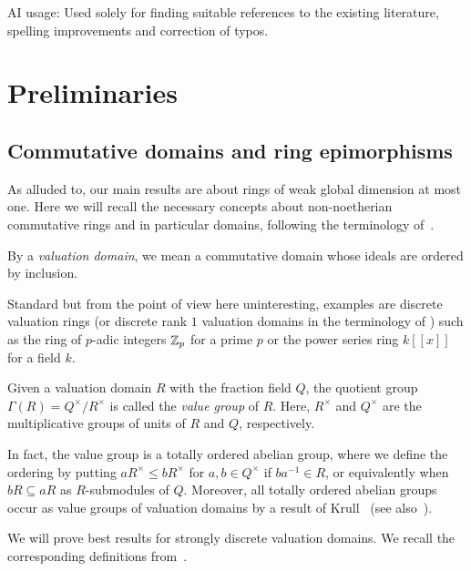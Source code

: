 \documentclass[reqno,a4paper]{amsart}
\begin{document}
AI usage: Used solely for finding suitable references to the existing literature, spelling improvements and correction of typos.


\section{Preliminaries}

\subsection{Commutative domains and ring epimorphisms}

As alluded to, our main results are about rings of weak global dimension at most one. Here we will recall the necessary concepts about non-noetherian commutative rings and in particular domains, following the terminology of~\cite{fs01}.

\begin{definition}[{\cite[\S II.1]{fs01}}] \label{def:VD}
By a \emph{valuation domain}, we mean a commutative domain whose ideals are ordered by inclusion.
\end{definition}

Standard but from the point of view here uninteresting, examples are discrete valuation rings (or discrete rank $1$ valuation domains in the terminology of \cite{fs01}) such as the ring of $p$-adic integers $\mathbb{Z}_p$ for a prime $p$ or the power series ring $k[[x]]$ for a field $k$.

\begin{definition}[{\cite[\S II.3]{fs01}}] \label{def:value-group}
Given a valuation domain $R$ with the fraction field $Q$, the quotient group $\Gamma(R) = Q^\times/R^\times$ is called the \emph{value group} of $R$. Here, $R^\times$ and $Q^\times$ are the multiplicative groups of units of $R$ and $Q$, respectively.
\end{definition}

In fact, the value group is a totally ordered abelian group, where we define the ordering by putting $aR^\times\le bR^\times$ for $a,b\in Q^\times$ if $ba^{-1}\in R$, or equivalently when $bR\subseteq aR$ as $R$-submodules of $Q$.
Moreover, all totally ordered abelian groups occur as value groups of valuation domains by a result of Krull~\cite{kru32} (see also~\cite[Theorem~II.3.8]{fs01}).

We will prove best results for strongly discrete valuation domains. We recall the corresponding definitions from~\cite[\S II.8]{fs01}.
\end{document}
